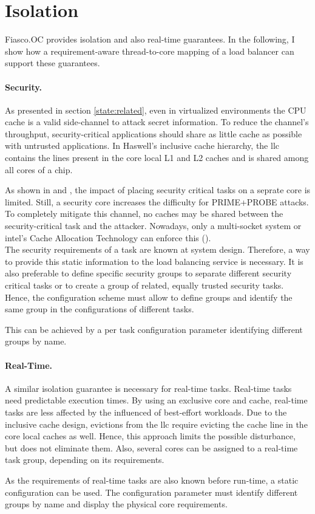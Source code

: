 \section{Isolation}
\label{design:isolation}

Fiasco.OC provides isolation and also real-time guarantees.
In the following, I show how a requirement-aware thread-to-core mapping of a
load balancer can support these guarantees.

\paragraph{Security.}
As presented in section \ref{state:related}, even in virtualized environments
the CPU cache is a valid side-channel to attack secret information.
To reduce the channel's throughput, security-critical applications should share
as little cache as possible with untrusted applications.
In Haswell's inclusive cache hierarchy, the \gls{llc} contains the lines
present in the core local L1 and L2 caches and is shared among all cores of a
chip.

As shown in \cite{inci_seriously_2015} and \cite{liu_last-level_2015},
the impact of placing security critical tasks on a seprate core is limited.
Still, a security core increases the difficulty for PRIME+PROBE attacks.
To completely mitigate this channel, no caches may be shared between the
security-critical task and the attacker.
Nowadays, only a multi-socket system or \gls{intel}'s Cache Allocation
Technology can enforce this (\cite{intel_cat}).
\\

The security requirements of a task are known at system design.
Therefore, a way to provide this static information to the load balancing
service is necessary.
It is also preferable to define specific security groups to separate different
security critical tasks or to create a group of related, equally trusted
security tasks.
Hence, the configuration scheme must allow to define groups and identify the
same group in the configurations of different tasks.

This can be achieved by a per task configuration parameter identifying
different groups by name.


\paragraph{Real-Time.}
A similar isolation guarantee is necessary for real-time tasks.
Real-time tasks need predictable execution times.
By using an exclusive core and cache, real-time tasks are less affected by the
influenced of best-effort workloads.
Due to the inclusive cache design, evictions from the \gls{llc} require
evicting the cache line in the core local caches as well.
Hence, this approach limits the possible disturbance, but does not eliminate them.
Also, several cores can be assigned to a real-time task group, depending on its
requirements.

As the requirements of real-time tasks are also known before run-time, a static
configuration can be used.
The configuration parameter must identify different groups by name
and display the physical core requirements.
